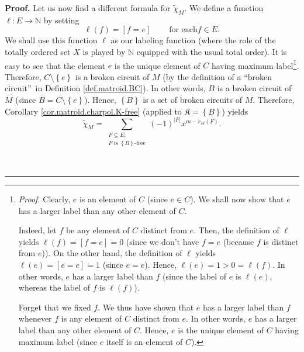 \documentclass[numbers=enddot,12pt,final,onecolumn,notitlepage]{scrartcl}%
\theoremstyle{definition}
\newenvironment{proof}[1][Proof]{\noindent\textbf{#1.} }{\ \rule{0.5em}{0.5em}}
\newenvironment{verlong}{}{}
\let\sumnonlimits\sum
\renewcommand{\sum}{\sumnonlimits\limits}
\begin{document}
\begin{verlong}
\begin{proof}
Let us now find a different formula for $\widetilde{\chi}_{M}$. We define a
function $\ell:E\rightarrow\mathbb{N}$ by setting%
\[
\ell\left(  f\right)  =\left[  f=e\right]  \ \ \ \ \ \ \ \ \ \ \text{for each
}f\in E.
\]
We shall use this function $\ell$ as our labeling function (where the role of
the totally ordered set $X$ is played by $\mathbb{N}$ equipped with the usual
total order). It is easy to see that the element $e$ is the unique element of
$C$ having maximum label\footnote{\textit{Proof.} Clearly, $e$ is an element
of $C$ (since $e\in C$). We shall now show that $e$ has a larger label than
any other element of $C$.
\par
Indeed, let $f$ be any element of $C$ distinct from $e$. Then, the definition
of $\ell$ yields $\ell\left(  f\right)  =\left[  f=e\right]  =0$ (since we
don't have $f=e$ (because $f$ is distinct from $e$)). On the other hand, the
definition of $\ell$ yields $\ell\left(  e\right)  =\left[  e=e\right]  =1$
(since $e=e$). Hence, $\ell\left(  e\right)  =1>0=\ell\left(  f\right)  $. In
other words, $e$ has a larger label than $f$ (since the label of $e$ is
$\ell\left(  e\right)  $, whereas the label of $f$ is $\ell\left(  f\right)
$).
\par
Forget that we fixed $f$. We thus have shown that $e$ has a larger label than
$f$ whenever $f$ is any element of $C$ distinct from $e$. In other words, $e$
has a larger label than any other element of $C$. Hence, $e$ is the unique
element of $C$ having maximum label (since $e$ itself is an element of $C$).}.
Therefore, $C\setminus\left\{  e\right\}  $ is a broken circuit of $M$ (by the
definition of a \textquotedblleft broken circuit\textquotedblright\ in
Definition \ref{def.matroid.BC}). In other words, $B$ is a broken circuit of
$M$ (since $B=C\setminus\left\{  e\right\}  $). Hence, $\left\{  B\right\}  $
is a set of broken circuits of $M$. Therefore, Corollary
\ref{cor.matroid.charpol.K-free} (applied to $\mathfrak{K}=\left\{  B\right\}
$) yields
\begin{equation}
\widetilde{\chi}_{M}=\sum_{\substack{F\subseteq E;\\F\text{ is }\left\{
B\right\}  \text{-free}}}\left(  -1\right)  ^{\left\vert F\right\vert
}x^{m-r_{M}\left(  F\right)  }. \label{pf.thm.dahwil.matroid.XiG.c2.pf.3}%
\end{equation}



\end{proof}
\end{verlong}
\end{document}

